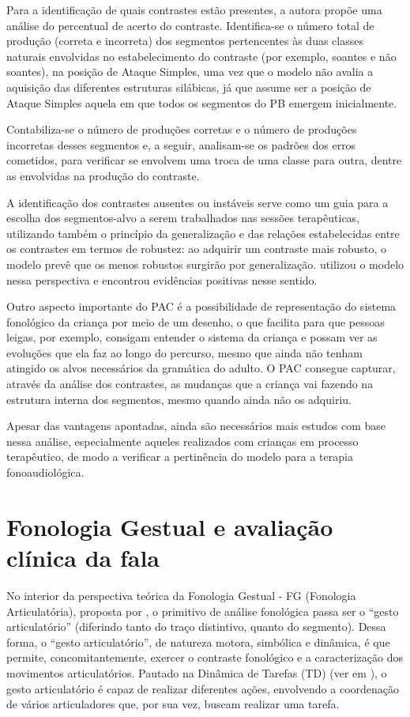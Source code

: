 \documentclass[output=paper,colorlinks,citecolor=brown,booklanguage=portuguese]{langscibook}
\begin{document}
Para a identificação de quais contrastes estão presentes, a autora propõe uma análise do percentual de acerto do contraste. Identifica-se o número total de produção (correta e incorreta) dos segmentos pertencentes às duas classes naturais envolvidas no estabelecimento do contraste (por exemplo, soantes e não soantes), na posição de Ataque Simples, uma vez que o modelo não avalia a aquisição das diferentes estruturas silábicas, já que assume ser a posição de Ataque Simples aquela em que todos os segmentos do PB emergem inicialmente. 

Contabiliza-se o número de produções corretas e o número de produções incorretas desses segmentos e, a seguir, analisam-se os padrões dos erros cometidos, para verificar se envolvem uma troca de uma classe para outra, dentre as envolvidas na produção do contraste.

A identificação dos contrastes ausentes ou instáveis serve como um guia para a escolha dos segmentos-alvo a serem trabalhados nas sessões terapêuticas, utilizando também o princípio da generalização e das relações estabelecidas entre os contrastes em termos de robustez: ao adquirir um contraste mais robusto, o modelo prevê que os menos robustos surgirão por generalização. \citet{Reis2018} utilizou o modelo nessa perspectiva e encontrou evidências positivas nesse sentido.

Outro aspecto importante do PAC é a possibilidade de representação do sistema fonológico da criança por meio de um desenho, o que facilita para que pessoas leigas, por exemplo, consigam entender o sistema da criança e possam ver as evoluções que ela faz ao longo do percurso, mesmo que ainda não tenham atingido os alvos necessários da gramática do adulto. O PAC consegue capturar, através da análise dos contrastes, as mudanças que a criança vai fazendo na estrutura interna dos segmentos, mesmo quando ainda não os adquiriu.

Apesar das vantagens apontadas, ainda são necessários mais estudos com base nessa análise, especialmente aqueles realizados com crianças em processo terapêutico, de modo a verificar a pertinência do modelo para a terapia fonoaudiológica.


\section{Fonologia Gestual e avaliação clínica da fala}\label{sec:cap4sec5}

No interior da perspectiva teórica da Fonologia Gestual - FG (Fonologia Articulatória), proposta por \citet{Browman1989, Browman1990, Browman1992}, o primitivo de análise fonológica passa ser o “gesto articulatório” (diferindo tanto do traço distintivo, quanto do segmento). Dessa forma, o “gesto articulatório”, de natureza motora, simbólica e dinâmica, é que permite, concomitantemente, exercer o contraste fonológico e a caracterização dos movimentos articulatórios. Pautado na Dinâmica de Tarefas (TD) (ver em \citealp{Browman1992}), o gesto articulatório é capaz de realizar diferentes ações, envolvendo a coordenação de vários articuladores que, por sua vez, buscam realizar uma tarefa.
\end{document}
